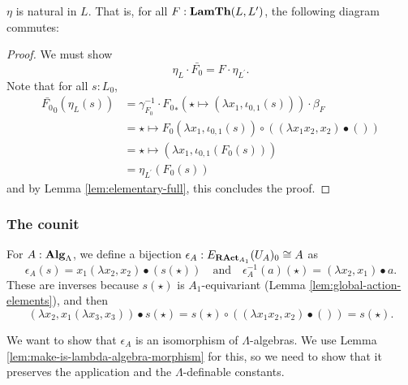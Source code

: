 \begin{lemma}
  $ \eta $ is natural in $ L $. That is, for all $ F: \mathbf{LamTh}(L, L^\prime) $, the following diagram commutes:
  \begin{center}
  \end{center}
\end{lemma}
\begin{proof}
  We must show
  \[ \eta_L \cdot \bar{F_0} = F \cdot \eta_{L^\prime}. \]
  Note that for all $ s : L_0 $,
  \begin{align*}
    \bar{F_0}_0(\eta_L(s))
    &= \gamma_{F_0}^{-1} \cdot {F_0}_*(\star \mapsto (\lambda x_1, \iota_{0, 1}(s))) \cdot \beta_F\\
    &= \star \mapsto F_0(\lambda x_1, \iota_{0, 1}(s)) \circ ((\lambda x_1 x_2, x_2) \bullet ())\\
    &= \star \mapsto (\lambda x_1, \iota_{0, 1}(F_0(s)))\\
    &= \eta_{L^\prime}(F_0(s))
  \end{align*}
  and by Lemma \ref{lem:elementary-full}, this concludes the proof.
\end{proof}

\subsubsection{The counit}

\begin{definition}
  For $ A : \mathbf{Alg}_{\Lambda} $, we define a bijection $ \epsilon_A : E_{\mathbf{RAct}_{A_1}}(U_A)_0 \cong A $ as
  \[ \epsilon_A(s) = x_1 (\lambda x_2, x_2) \bullet (s(\star)) \quad \text{and} \quad \epsilon_A^{-1}(a)(\star) = (\lambda x_2, x_1) \bullet a. \]
  These are inverses because $ s(\star) $ is $ A_1 $-equivariant (Lemma \ref{lem:global-action-elements}), and then
  \[ (\lambda x_2, x_1 (\lambda x_3, x_3)) \bullet s(\star) = s(\star) \circ ((\lambda x_1 x_2, x_2) \bullet ()) = s(\star). \]
\end{definition}

We want to show that $ \epsilon_A $ is an isomorphism of $ \Lambda $-algebras. We use Lemma \ref{lem:make-is-lambda-algebra-morphism} for this, so we need to show that it preserves the application and the $ \Lambda $-definable constants.


